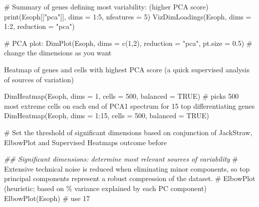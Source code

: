 \documentclass[
  letterpaper,
  DIV=11,
  numbers=noendperiod]{scrreprt}
\newenvironment{Shaded}{\begin{snugshade}}{\end{snugshade}}
\newcommand{\AttributeTok}[1]{\textcolor[rgb]{0.40,0.45,0.13}{#1}}
\newcommand{\CommentTok}[1]{\textcolor[rgb]{0.37,0.37,0.37}{#1}}
\newcommand{\ConstantTok}[1]{\textcolor[rgb]{0.56,0.35,0.01}{#1}}
\newcommand{\DecValTok}[1]{\textcolor[rgb]{0.68,0.00,0.00}{#1}}
\newcommand{\DocumentationTok}[1]{\textcolor[rgb]{0.37,0.37,0.37}{\textit{#1}}}
\newcommand{\FloatTok}[1]{\textcolor[rgb]{0.68,0.00,0.00}{#1}}
\newcommand{\FunctionTok}[1]{\textcolor[rgb]{0.28,0.35,0.67}{#1}}
\newcommand{\NormalTok}[1]{\textcolor[rgb]{0.00,0.23,0.31}{#1}}
\newcommand{\SpecialCharTok}[1]{\textcolor[rgb]{0.37,0.37,0.37}{#1}}
\newcommand{\StringTok}[1]{\textcolor[rgb]{0.13,0.47,0.30}{#1}}
\begin{document}
\begin{Shaded}
\begin{Highlighting}[]
\CommentTok{\# Summary of genes defining most variability: (higher PCA score)}
\FunctionTok{print}\NormalTok{(Esoph[[}\StringTok{"pca"}\NormalTok{]], }\AttributeTok{dims =} \DecValTok{1}\SpecialCharTok{:}\DecValTok{5}\NormalTok{, }\AttributeTok{nfeatures =} \DecValTok{5}\NormalTok{)}
\FunctionTok{VizDimLoadings}\NormalTok{(Esoph, }\AttributeTok{dims =} \DecValTok{1}\SpecialCharTok{:}\DecValTok{2}\NormalTok{, }\AttributeTok{reduction =} \StringTok{"pca"}\NormalTok{)}

\CommentTok{\# PCA plot:}
\FunctionTok{DimPlot}\NormalTok{(Esoph, }\AttributeTok{dims =} \FunctionTok{c}\NormalTok{(}\DecValTok{1}\NormalTok{,}\DecValTok{2}\NormalTok{), }\AttributeTok{reduction =} \StringTok{"pca"}\NormalTok{, }\AttributeTok{pt.size =} \FloatTok{0.5}\NormalTok{) }\CommentTok{\# change the dimensions as you want}
\end{Highlighting}
\end{Shaded}

Heatmap of genes and cells with highest PCA score (a quick supervised
analysis of sources of variation)

\begin{Shaded}
\begin{Highlighting}[]
\FunctionTok{DimHeatmap}\NormalTok{(Esoph, }\AttributeTok{dims =} \DecValTok{1}\NormalTok{, }\AttributeTok{cells =} \DecValTok{500}\NormalTok{, }\AttributeTok{balanced =} \ConstantTok{TRUE}\NormalTok{) }\CommentTok{\# picks 500 most extreme cells on each end of PCA1 spectrum for 15 top differentiating genes}
\FunctionTok{DimHeatmap}\NormalTok{(Esoph, }\AttributeTok{dims =} \DecValTok{1}\SpecialCharTok{:}\DecValTok{15}\NormalTok{, }\AttributeTok{cells =} \DecValTok{500}\NormalTok{, }\AttributeTok{balanced =} \ConstantTok{TRUE}\NormalTok{)}
\end{Highlighting}
\end{Shaded}

\begin{Shaded}
\begin{Highlighting}[]
\CommentTok{\# Set the threshold of significant dimensions based on conjunction of JackStraw, ElbowPlot and Supervised Heatmaps outcome before}

\DocumentationTok{\#\# Significant dimensions: determine most relevant sources of variability}
\CommentTok{\# Extensive technical noise is reduced when eliminating minor components, so top principal components represent a robust compression of the dataset.}
\CommentTok{\# ElbowPlot (heuristic; based on \% variance explained by each PC component)}
\FunctionTok{ElbowPlot}\NormalTok{(Esoph) }\CommentTok{\# use 17}
\end{Highlighting}
\end{Shaded}
\end{document}

